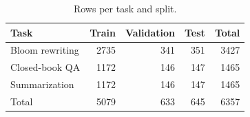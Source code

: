 \begin{table}[t]
\centering
\caption{Rows per task and split.}
\label{tab:t1_dataset_splits}
\begin{tabular}{lrrrr}
\toprule
Task & Train & Validation & Test & Total \\
\midrule
Bloom rewriting & 2735 & 341 & 351 & 3427 \\
Closed-book QA & 1172 & 146 & 147 & 1465 \\
Summarization & 1172 & 146 & 147 & 1465 \\
Total & 5079 & 633 & 645 & 6357 \\
\bottomrule
\end{tabular}
\end{table}
